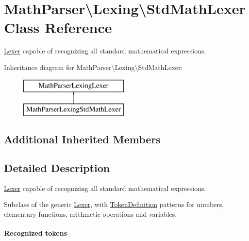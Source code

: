 \hypertarget{classMathParser_1_1Lexing_1_1StdMathLexer}{\section{Math\-Parser\textbackslash{}Lexing\textbackslash{}Std\-Math\-Lexer Class Reference}
\label{classMathParser_1_1Lexing_1_1StdMathLexer}
}


\hyperlink{classMathParser_1_1Lexing_1_1Lexer}{Lexer} capable of recognizing all standard mathematical expressions.  


Inheritance diagram for Math\-Parser\textbackslash{}Lexing\textbackslash{}Std\-Math\-Lexer\-:\begin{figure}[H]
\begin{center}
\leavevmode
\includegraphics[height=2.000000cm]{classMathParser_1_1Lexing_1_1StdMathLexer}
\end{center}
\end{figure}
\subsection*{Additional Inherited Members}


\subsection{Detailed Description}
\hyperlink{classMathParser_1_1Lexing_1_1Lexer}{Lexer} capable of recognizing all standard mathematical expressions. 

Subclass of the generic \hyperlink{classMathParser_1_1Lexing_1_1Lexer}{Lexer}, with \hyperlink{classMathParser_1_1Lexing_1_1TokenDefinition}{Token\-Definition} patterns for numbers, elementary functions, arithmetic operations and variables.

\paragraph*{Recognized tokens}


